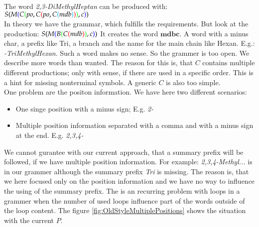 \documentclass[a4paper,10pt]{article}
\newcommand{\gerquot}[1]{\glqq#1\grqq}
\newcommand{\colorBracketFirstNesting}{black}
\newcommand{\colorBracketSecondNesting}{blue}
\newcommand{\colorBracketThirdNesting}{green}
\newcommand{\colorBracketFourthNesting}{red}
\newcommand{\colorBracketFifthNesting}{cyan}
\begin{document}
\noindent The word \emph{2,3-DiMethylHeptan} can be produced with:
$
S
{\color{\colorBracketFirstNesting}{(}}
    M
    {\color{\colorBracketSecondNesting}{(}}
        C
        {\color{\colorBracketThirdNesting}{(}}
            po,
            C
            {\color{\colorBracketFourthNesting}{(}}
                po,
                C
                {\color{\colorBracketFifthNesting}{(}}
                    mdb
                {\color{\colorBracketFifthNesting}{)}}
            {\color{\colorBracketFourthNesting}{)}}
        {\color{\colorBracketThirdNesting}{)}}
        , c
    {\color{\colorBracketSecondNesting}{)}}
{\color{\colorBracketFirstNesting}{)}}
$\\


In theory we have the grammar, which fulfills the requirements. But look at the production:
$
S
{\color{\colorBracketFirstNesting}{(}}
    M
    {\color{\colorBracketSecondNesting}{(}}
        B
        {\color{\colorBracketThirdNesting}{(}}
            C
            {\color{\colorBracketFourthNesting}{(}}
                mdb
            {\color{\colorBracketFourthNesting}{)}}
        {\color{\colorBracketThirdNesting}{)}}
        , c
    {\color{\colorBracketSecondNesting}{)}}
{\color{\colorBracketFirstNesting}{)}}
$
It creates the word $\textbf{mdbc}$. A word with a minus char, a prefix like \gerquot{Tri}, a branch and the name for the main chain like \gerquot{Hexan}. E.g.: \emph{-TriMethylHexan}. Such a word makes no sense. So the grammer is too open. We describe more words than wanted. The reason for this is, that $C$ contains multiple different productions; only with sense, if there are used in a specific order. This is a hint for missing nonterminal symbols. A generic $C$ is also too simple.\\

\noindent One problem are the positon information. We have here two different scenarios:
\begin{itemize}
    \item One singe position with a minus sign; E.g. \emph{2-}
    \item Multiple position information separated with a comma and with a minus sign at the end. E.g. \emph{2,3,4-}
\end{itemize}
We cannot gurantee with our current approach, that a summary prefix will be followed, if we have multiple position information. For example: \emph{2,3,4-Methyl...} is in our grammer although the summary prefix \emph{Tri} is missing. The reason is, that we here focused only on the position information and we have no way to influence the using of the summary prefix. The is an recurring problem with loops in a grammer when the number of used loops influence part of the words outside of the loop content. The figure \ref{fig:OldStyleMultiplePositions} shows the situation with the current $P$.
\end{document}
